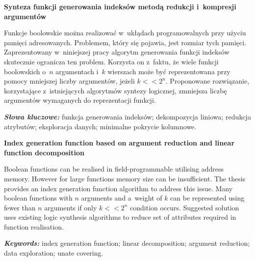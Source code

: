 \newpage
\vspace{10cm}

\newpage
\begin{center}
	\textbf{Synteza funkcji generowania indeksów metodą redukcji i~kompresji argumentów}
\end{center}

Funkcje boolowskie można realizować w~ukłądach programowalnych przy użyciu pamięci adresowanych.
Problemem, który się pojawia, jest rozmiar tych pamięci.
Zaprezentowany w~niniejszej pracy algorytm generowania funkcji indeksów skutecznie ogranicza ten problem.
Korzysta on z~faktu,
że wiele funkcji boolowskich o~$n$ argumentach i~$k$ wierszach może być reprezentowana przy pomocy mniejszej liczby argumentów,
jeżeli $k<<2^n$.
Proponowane rozwiązanie,
korzystające z~istniejących algorytmów syntezy logicznej,
zmniejsza liczbę argumentów wymaganych do reprezentacji funkcji.

\textit{\textbf{Słowa kluczowe:}} funkcja generowania indeksów; dekompozycja liniowa; redukcja atrybutów; eksploracja danych; minimalne pokrycie kolumnowe.

	\vspace{1cm}
\newpage

\begin{center}
    \textbf{Index generation function based on argument reduction and linear function decomposition}
\end{center}

Boolean functions can be realised in field-programmable utilising address memory.
However for large functions memory size can be insufficient.
The thesis provides an index generation function algorithm to address this issue.
Many boolean functions with $n$ arguments and a~weight of $k$ can be represented using fewer than $n$ arguments if only $k<<2^n$ condition occurs.
Suggested solution uses existing logic synthesis algorithms to reduce set of attributes required in function realisation.

\textit{\textbf{Keywords:}} index generation function; linear decomposition; argument reduction; data exploration; unate covering.

